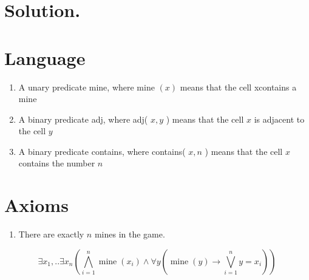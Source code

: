 \documentclass[10pt]{article}
\begin{document}
\section{Solution.}
\section{Language}
\begin{enumerate}
  \item A unary predicate mine, where mine $(x)$ means that the cell xcontains a mine
  \item A binary predicate adj, where adj( $x, y$ ) means that the cell $x$ is adjacent to the cell $y$
  \item A binary predicate contains, where contains( $x, n$ ) means that the cell $x$ contains the number $n$
\end{enumerate}

\section{Axioms}
\begin{enumerate}
  \item There are exactly $n$ mines in the game.
\end{enumerate}

$$
\exists x_{1}, . . \exists x_{n}\left(\bigwedge_{i=1}^{n} \operatorname{mine}\left(x_{i}\right) \wedge \forall y\left(\operatorname{mine}(y) \rightarrow \bigvee_{i=1}^{n} y=x_{i}\right)\right)
$$
\end{document}
